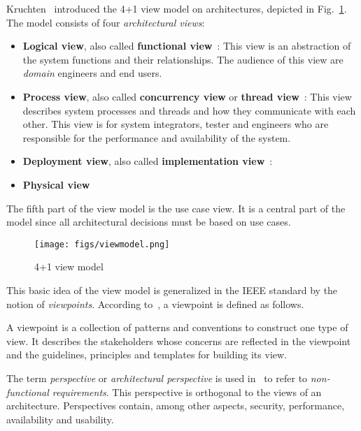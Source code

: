\documentclass{llncs} %
\begin{document}
Kruchten~\cite{Kruchten1995T41} introduced the 4+1 view model on architectures,
depicted in Fig.~\ref{fig:viewmodel}.
The model consists of four \emph{architectural views}:
\begin{itemize}
	\item \textbf{Logical view}, also called \textbf{functional view}~\cite{Clements2001ESA}:
	        This view is an abstraction of the system functions and their relationships. The audience
					 of this view are \emph{domain} engineers and end users.
	\item \textbf{Process view}, also called \textbf{concurrency view}
	                or \textbf{thread view}~\cite{Clements2001ESA}:
									 This view describes system processes and threads and how they communicate with each other.
									This view is for system integrators, tester and engineers who are
									responsible for the performance and availability of the system.
	 \item \textbf{Deployment view}, also called \textbf{implementation view}~\cite{Clements2001ESA}:
                     
	 \item \textbf{Physical view}
\end{itemize}

The fifth part of the view model is the use case view. It is a central part of the model since
all architectural decisions must be based on use cases.

\begin{figure}%
\begin{center}
\texttt{[image: figs/viewmodel.png]}%
\caption{4+1 view model}%
\label{fig:viewmodel}%
\end{center}
\end{figure}

This basic idea of the view model is generalized in the IEEE standard  by the notion of \emph{viewpoints}.
According to~\cite{Rozanski2005SSA}, a viewpoint is defined as follows.

\begin{definition}[Viewpoint]
A viewpoint is a collection of patterns and conventions to construct one type of view.
It describes the stakeholders whose concerns  are reflected in the viewpoint
and the guidelines, principles and templates for building its view.
\end{definition}

The term \emph{perspective} or \emph{architectural perspective} is used in~\cite{Rozanski2005SSA}
to refer to \emph{non-functional requirements}. This perspective is orthogonal to
the views of an architecture. Perspectives contain,
among other aspects, security, performance, availability and usability.
\end{document}
